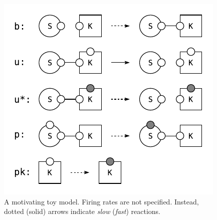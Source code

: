 \begin{figure}[h]
  \vskip -0.2cm
  \begin{center}
    \includegraphics[scale=0.9]{figures/model.pdf}
  \end{center}
  \vskip -0.2cm
  \caption{A motivating toy model.   Firing rates are not specified. Instead,
    dotted (solid) arrows indicate \textit{slow} (\textit{fast}) reactions.}
  \label{fig:model}
\end{figure}
